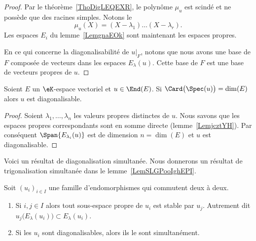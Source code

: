 \begin{proof}
	Par le théorème~\ref{ThoDigLEQEXR}, le polynôme \( \mu_u\) est scindé et ne possède que des racines simples. Notons le
	\begin{equation}
		\mu_u(X)=(X-\lambda_1)\ldots (X-\lambda_r).
	\end{equation}
	Les espaces \( E_i\) du lemme~\ref{LemgnaEOk} sont maintenant les espaces propres.

	En ce qui concerne la diagonalisabilité de \( u|_F\), notons que nous avons une base de \( F\) composée de vecteurs dans les espaces \( E_{\lambda}(u)\). Cette base de \( F\) est une base de vecteurs propres de \( u\).
\end{proof}

\begin{lemma}
	Soient \( E\) un \( \eK\)-espace vectoriel et \( u\in\End(E)\). Si \( \Card\big( \Spec(u) \big)=\dim(E)\) alors \( u\) est diagonalisable.
\end{lemma}

\begin{proof}
	Soient \( \lambda_1,\ldots, \lambda_n\) les valeurs propres distinctes de \( u\). Nous savons que les espaces propres correspondants sont en somme directe (lemme~\ref{LemjcztYH}). Par conséquent \( \Span\{ E_{\lambda_i}(u) \}\) est de dimension \( n=\dim(E)\) et \( u\) est diagonalisable.
\end{proof}

Voici un résultat de diagonalisation simultanée. Nous donnerons un résultat de trigonalisation simultanée dans le lemme~\ref{LemSLGPooIghEPI}.
\begin{proposition}     \label{PropGqhAMei}
	Soit \( (u_i)_{i\in I}\) une famille d'endomorphismes qui commutent deux à deux.
	\begin{enumerate}
		\item       \label{ItemGqhAMei}
		      Si \( i,j\in I\) alors tout sous-espace propre de \( u_i\) est stable par \( u_j\). Autrement dit \( u_j\big(E_{\lambda}(u_i)\big)\subset E_{\lambda}(u_i)\).
		\item
		      Si les \( u_i\) sont diagonalisables, alors ils le sont simultanément.
	\end{enumerate}
\end{proposition}

